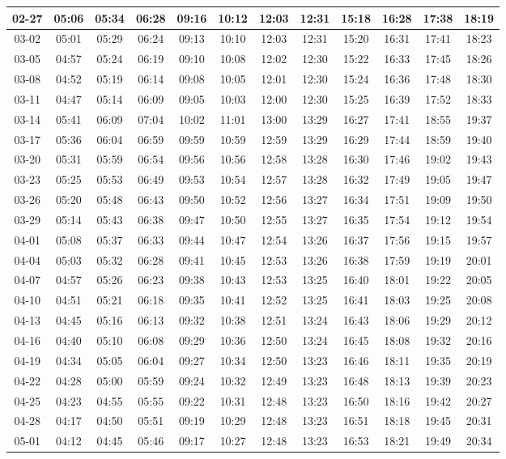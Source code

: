 \begin{footnotesize}
\begin{tabular}{c | c | c| c| c| c| c| c| c| c| c| c}
		02-27&05:06&05:34&06:28&09:16&10:12&12:03&12:31&15:18&16:28&17:38&18:19\\\hline
		03-02&05:01&05:29&06:24&09:13&10:10&12:03&12:31&15:20&16:31&17:41&18:23\\\hline
		03-05&04:57&05:24&06:19&09:10&10:08&12:02&12:30&15:22&16:33&17:45&18:26\\\hline
		03-08&04:52&05:19&06:14&09:08&10:05&12:01&12:30&15:24&16:36&17:48&18:30\\\hline
		03-11&04:47&05:14&06:09&09:05&10:03&12:00&12:30&15:25&16:39&17:52&18:33\\\hline
		03-14&05:41&06:09&07:04&10:02&11:01&13:00&13:29&16:27&17:41&18:55&19:37\\\hline
		03-17&05:36&06:04&06:59&09:59&10:59&12:59&13:29&16:29&17:44&18:59&19:40\\\hline
		03-20&05:31&05:59&06:54&09:56&10:56&12:58&13:28&16:30&17:46&19:02&19:43\\\hline
		03-23&05:25&05:53&06:49&09:53&10:54&12:57&13:28&16:32&17:49&19:05&19:47\\\hline
		03-26&05:20&05:48&06:43&09:50&10:52&12:56&13:27&16:34&17:51&19:09&19:50\\\hline
		03-29&05:14&05:43&06:38&09:47&10:50&12:55&13:27&16:35&17:54&19:12&19:54\\\hline
		04-01&05:08&05:37&06:33&09:44&10:47&12:54&13:26&16:37&17:56&19:15&19:57\\\hline
		04-04&05:03&05:32&06:28&09:41&10:45&12:53&13:26&16:38&17:59&19:19&20:01\\\hline
		04-07&04:57&05:26&06:23&09:38&10:43&12:53&13:25&16:40&18:01&19:22&20:05\\\hline
		04-10&04:51&05:21&06:18&09:35&10:41&12:52&13:25&16:41&18:03&19:25&20:08\\\hline
		04-13&04:45&05:16&06:13&09:32&10:38&12:51&13:24&16:43&18:06&19:29&20:12\\\hline
		04-16&04:40&05:10&06:08&09:29&10:36&12:50&13:24&16:45&18:08&19:32&20:16\\\hline
		04-19&04:34&05:05&06:04&09:27&10:34&12:50&13:23&16:46&18:11&19:35&20:19\\\hline
		04-22&04:28&05:00&05:59&09:24&10:32&12:49&13:23&16:48&18:13&19:39&20:23\\\hline
		04-25&04:23&04:55&05:55&09:22&10:31&12:48&13:23&16:50&18:16&19:42&20:27\\\hline
		04-28&04:17&04:50&05:51&09:19&10:29&12:48&13:23&16:51&18:18&19:45&20:31\\\hline
		05-01&04:12&04:45&05:46&09:17&10:27&12:48&13:23&16:53&18:21&19:49&20:34\\\hline

\end{tabular}
\end{footnotesize}
